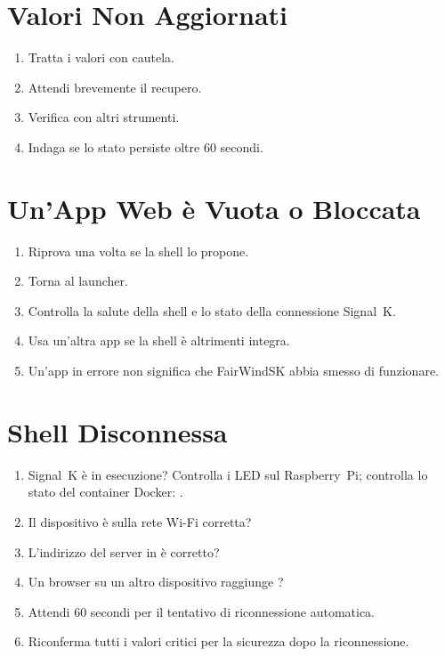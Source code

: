 \section{Valori Non Aggiornati}

\begin{enumerate}
  \item Tratta i valori con cautela.
  \item Attendi brevemente il recupero.
  \item Verifica con altri strumenti.
  \item Indaga se lo stato persiste oltre 60 secondi.
\end{enumerate}

\section{Un'App Web è Vuota o Bloccata}

\begin{enumerate}
  \item Riprova una volta se la shell lo propone.
  \item Torna al launcher.
  \item Controlla la salute della shell e lo stato della connessione Signal~K.
  \item Usa un'altra app se la shell è altrimenti integra.
  \item Un'app in errore non significa che FairWindSK abbia smesso di funzionare.
\end{enumerate}

\section{Shell Disconnessa}

\begin{enumerate}
  \item Signal~K è in esecuzione? Controlla i LED sul Raspberry~Pi; controlla lo stato
        del container Docker: .
  \item Il dispositivo è sulla rete Wi-Fi corretta?
  \item L'indirizzo del server in  è corretto?
  \item Un browser su un altro dispositivo raggiunge ?
  \item Attendi 60 secondi per il tentativo di riconnessione automatica.
  \item Riconferma tutti i valori critici per la sicurezza dopo la riconnessione.
\end{enumerate}

